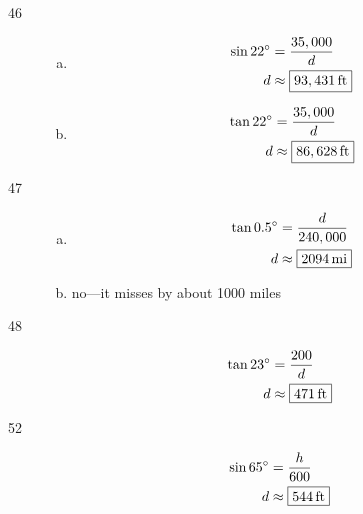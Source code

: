 \documentclass{exam}
\newcommand{\dg}{\ensuremath{^\circ}}
\begin{document}
\begin{description}
      \item[46]
        \begin{enumerate}[(a)]
          \item 
            \begin{align*}
              \sin 22 \dg & = \frac{35,000}{d} \\
              d           & \approx \boxed{ \unit[93,431]{ft} } \\
            \end{align*}

          \item 
            \begin{align*}
              \tan 22 \dg & = \frac{35,000}{d} \\
              d           & \approx \boxed{ \unit[86,628]{ft} } \\
            \end{align*}

        \end{enumerate}

      \pagebreak

      \item[47]
        \begin{enumerate}[(a)]
          \item 
            \begin{align*}
              \tan 0.5 \dg & = \frac{d}{240,000} \\
              d           & \approx \boxed{ \unit[2094]{mi} } \\
            \end{align*}

          \item 
            no---it misses by about 1000 miles
        \end{enumerate}

      \item[48]
        \begin{align*}
          \tan 23 \dg & = \frac{200}{d} \\
          d           & \approx \boxed{ \unit[471]{ft} } \\
        \end{align*}

      \item[52]
        \begin{align*}
          \sin 65 \dg & = \frac{h}{600} \\
          d           & \approx \boxed{ \unit[544]{ft} } \\
        \end{align*}


\end{description}
\end{document}
